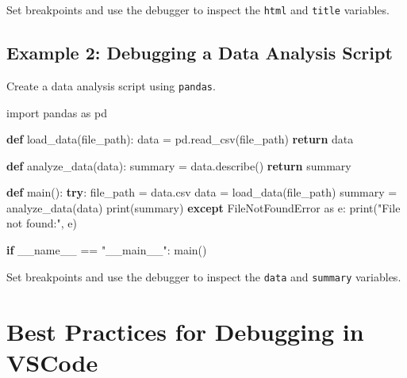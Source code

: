 \documentclass[
  letterpaper,
  DIV=11,
  numbers=noendperiod]{scrreprt}
\newenvironment{Shaded}{\begin{snugshade}}{\end{snugshade}}
\newcommand{\BuiltInTok}[1]{\textcolor[rgb]{0.00,0.23,0.31}{#1}}
\newcommand{\ControlFlowTok}[1]{\textcolor[rgb]{0.00,0.23,0.31}{\textbf{#1}}}
\newcommand{\ImportTok}[1]{\textcolor[rgb]{0.00,0.46,0.62}{#1}}
\newcommand{\KeywordTok}[1]{\textcolor[rgb]{0.00,0.23,0.31}{\textbf{#1}}}
\newcommand{\NormalTok}[1]{\textcolor[rgb]{0.00,0.23,0.31}{#1}}
\newcommand{\OperatorTok}[1]{\textcolor[rgb]{0.37,0.37,0.37}{#1}}
\newcommand{\PreprocessorTok}[1]{\textcolor[rgb]{0.68,0.00,0.00}{#1}}
\newcommand{\StringTok}[1]{\textcolor[rgb]{0.13,0.47,0.30}{#1}}
\newcommand{\VariableTok}[1]{\textcolor[rgb]{0.07,0.07,0.07}{#1}}
\begin{document}
Set breakpoints and use the debugger to inspect the \texttt{html} and
\texttt{title} variables.

\subsection{Example 2: Debugging a Data Analysis
Script}\label{example-2-debugging-a-data-analysis-script}

Create a data analysis script using \texttt{pandas}.

\begin{Shaded}
\begin{Highlighting}[]
\ImportTok{import}\NormalTok{ pandas }\ImportTok{as}\NormalTok{ pd}

\KeywordTok{def}\NormalTok{ load\_data(file\_path):}
\NormalTok{    data }\OperatorTok{=}\NormalTok{ pd.read\_csv(file\_path)}
    \ControlFlowTok{return}\NormalTok{ data}

\KeywordTok{def}\NormalTok{ analyze\_data(data):}
\NormalTok{    summary }\OperatorTok{=}\NormalTok{ data.describe()}
    \ControlFlowTok{return}\NormalTok{ summary}

\KeywordTok{def}\NormalTok{ main():}
    \ControlFlowTok{try}\NormalTok{:}
\NormalTok{        file\_path }\OperatorTok{=} \StringTok{\textquotesingle{}data.csv\textquotesingle{}}
\NormalTok{        data }\OperatorTok{=}\NormalTok{ load\_data(file\_path)}
\NormalTok{        summary }\OperatorTok{=}\NormalTok{ analyze\_data(data)}
        \BuiltInTok{print}\NormalTok{(summary)}
    \ControlFlowTok{except} \PreprocessorTok{FileNotFoundError} \ImportTok{as}\NormalTok{ e:}
        \BuiltInTok{print}\NormalTok{(}\StringTok{"File not found:"}\NormalTok{, e)}

\ControlFlowTok{if} \VariableTok{\_\_name\_\_} \OperatorTok{==} \StringTok{"\_\_main\_\_"}\NormalTok{:}
\NormalTok{    main()}
\end{Highlighting}
\end{Shaded}

Set breakpoints and use the debugger to inspect the \texttt{data} and
\texttt{summary} variables.

\section{Best Practices for Debugging in
VSCode}\label{best-practices-for-debugging-in-vscode}
\end{document}
